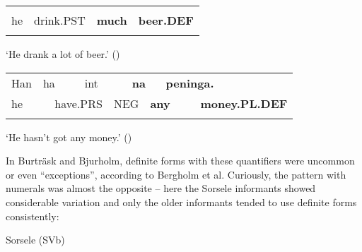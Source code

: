 \begin{tabular}{llll}
\lsptoprule
\multicolumn{4}{l}{Han

}\\
he & drink.PST & {\bfseries much} & {\bfseries beer.DEF}\\
\lspbottomrule
\end{tabular}

\begin{styleTranslation}
‘He drank a lot of beer.’ (\citet[24]{BergholmEtAl1999})

\end{styleTranslation}

\begin{tabular}{llllllllll}
\lsptoprule
Han & \multicolumn{2}{l}{ha

} & \multicolumn{2}{l}{int

} & \multicolumn{2}{l}{{\bfseries na}

} & \multicolumn{2}{l}{{\bfseries peninga.}

} & \\
\multicolumn{2}{l}{he

} & \multicolumn{2}{l}{have.PRS

} & \multicolumn{2}{l}{NEG

} & \multicolumn{2}{l}{{\bfseries any}

} & \multicolumn{2}{l}{{\bfseries money.PL.DEF}

}\\
\lspbottomrule
\end{tabular}

\begin{styleTranslation}
‘He hasn’t got any money.’ (\citet[24]{BergholmEtAl1999})

\end{styleTranslation}

\begin{styleBodyTextFirst}
In Burträsk and Bjurholm, definite forms with these quantifiers were uncommon or even “exceptions”, according to Bergholm et al. Curiously, the pattern with numerals was almost the opposite – here the Sorsele informants showed considerable variation and only the older informants tended to use definite forms consistently:

\end{styleBodyTextFirst}


\begin{listWWNumileveli}
\item 

\begin{styleExample}
Sorsele (SVb) 

\end{styleExample}

\end{listWWNumileveli}

